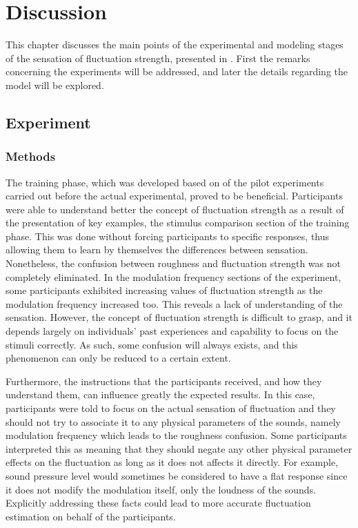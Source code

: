 \documentclass[../main.tex]{subfiles}
\begin{document}
\chapter{Discussion}
\label{cha:discussion}

This chapter discusses the main points of the experimental and modeling stages
of the sensation of fluctuation strength, presented in
. First the remarks concerning the experiments
will be addressed, and later the details regarding the model will be explored.

\section{Experiment}

\subsection{Methods}

The training phase, which was developed based on of the pilot experiments carried
out before the actual experimental, proved to be beneficial. Participants were
able to understand better the concept of fluctuation strength as a result of the
presentation of key examples, the stimulus comparison section of the training
phase. This was done without forcing participants to specific responses, thus
allowing them to learn by themselves the differences between sensation.
Nonetheless, the confusion between roughness and fluctuation strength was not
completely eliminated. In the modulation frequency sections of the experiment,
some participants exhibited increasing values of fluctuation strength as the
modulation frequency increased too. This reveals a lack of understanding of the
sensation. However, the concept of fluctuation strength is difficult to grasp,
and it depends largely on individuals' past experiences and capability to focus
on the stimuli correctly. As such, some confusion will always exists, and this
phenomenon can only be reduced to a certain extent.

Furthermore, the instructions that the participants received, and how they
understand them, can influence greatly the expected results. In this case,
participants were told to focus on the actual sensation of fluctuation and they
should not try to associate it to any physical parameters of the sounds, namely
modulation frequency which leads to the roughness confusion. Some participants
interpreted this as meaning that they should negate any other physical parameter
effects on the fluctuation as long as it does not affects it directly. For
example, sound pressure level would sometimes be considered to have a flat
response since it does not modify the modulation itself, only the loudness of
the sounds. Explicitly addressing these facts could lead to more accurate
fluctuation estimation on behalf of the participants.
\end{document}
